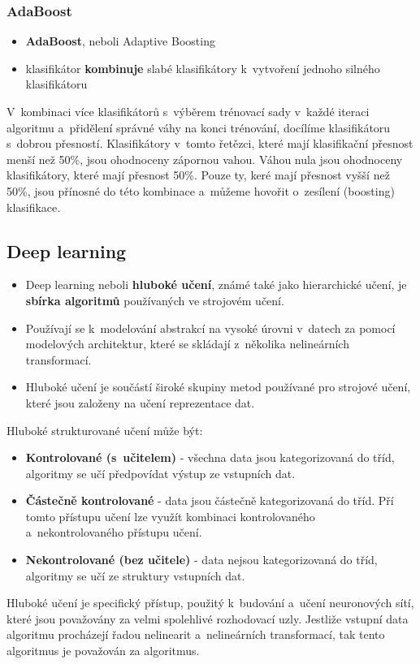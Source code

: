 \subsubsection{AdaBoost}
\begin{itemize}
  \item \textbf{AdaBoost}, neboli Adaptive Boosting
  \item klasifikátor \textbf{kombinuje} slabé klasifikátory k~vytvoření jednoho silného klasifikátoru
\end{itemize}
V~kombinaci více klasifikátorů s~výběrem trénovací sady v~každé iteraci algoritmu a~přidělení správné váhy na konci trénování, docílíme klasifikátoru s~dobrou přesností. Klasifikátory v~tomto řetězci, které mají klasifikační přesnost menší než 50\%, jsou ohodnoceny zápornou vahou. Váhou nula jsou ohodnoceny klasifikátory, které mají přesnost 50\%. Pouze ty, keré mají přesnost vyšší než 50\%, jsou přínosné do této kombinace a~můžeme hovořit o~zesílení (boosting) klasifikace. 

\subsection{Deep learning}
\begin{itemize}
  \item Deep learning neboli \textbf{hluboké učení}, známé také jako hierarchické učení, je \textbf{sbírka algoritmů} používaných ve strojovém učení.
  \item Používají se k~modelování abstrakcí na vysoké úrovni v~datech za pomocí modelových architektur, které se skládají z~několika nelineárních transformací.
  \item Hluboké učení je součástí široké skupiny metod používané pro strojové učení, které jsou založeny na učení reprezentace dat.
\end{itemize}
Hluboké strukturované učení může být:
\begin{itemize}
  \item{\textbf{Kontrolované (s~učitelem)} - všechna data jsou kategorizovaná do tříd, algoritmy se učí předpovídat výstup ze vstupních dat.}
  \item{\textbf{Částečně kontrolované} - data jsou částečně kategorizovaná do tříd. Pří tomto přístupu učení lze využít kombinaci kontrolovaného a~nekontrolovaného přístupu učení.}
  \item{\textbf{Nekontrolované (bez učitele)} - data nejsou kategorizovaná do tříd, algoritmy se učí ze struktury vstupních dat.}
\end{itemize}
Hluboké učení je specifický přístup, použitý k~budování a~učení neuronových sítí, které jsou považovány za velmi spolehlivé rozhodovací uzly. Jestliže vstupní data algoritmu procházejí řadou nelinearit a~nelineárních transformací, tak tento algoritmus je považován za  algoritmus. 

